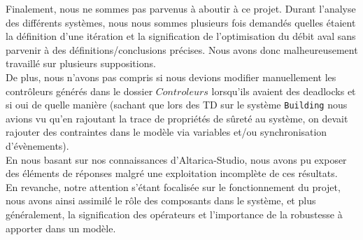 \documentclass[a4paper]{book}
\begin{document}
Finalement, nous ne sommes pas parvenus à aboutir à ce projet. Durant l'analyse des différents systèmes, nous nous sommes plusieurs fois demandés quelles étaient la définition d'une itération et la signification de l'optimisation du débit aval sans parvenir à des définitions/conclusions précises. Nous avons donc malheureusement travaillé sur plusieurs suppositions.\\
De plus, nous n'avons pas compris si nous devions modifier manuellement les contrôleurs générés dans le dossier $Controleurs$ lorsqu'ils avaient des deadlocks et si oui de quelle manière (sachant que lors des TD sur le système {\tt Building} nous avions vu qu'en rajoutant la trace de propriétés de sûreté au système, on devait rajouter des contraintes dans le modèle via variables et/ou synchronisation d'évènements).\\
En nous basant sur nos connaissances d'Altarica-Studio, nous avons pu exposer des éléments de réponses malgré une exploitation incomplète de ces résultats. \\
En revanche, notre attention s'étant focalisée sur le fonctionnement du projet, nous avons ainsi assimilé le rôle des composants dans le système, et plus généralement, la signification des opérateurs et l'importance de la robustesse à apporter dans un modèle. \\
\end{document}
